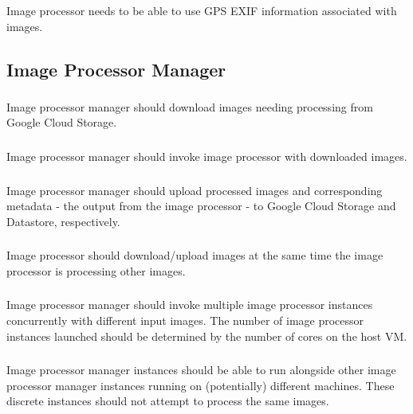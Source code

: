 \documentclass[10pt, onecolumn, draftclsnofoot, letterpaper, compsoc]{IEEEtran}
\begin{document}
Image processor needs to be able to use GPS EXIF information associated with
images.\\

\subsection{Image Processor Manager}

    \subsubsection{} 
    Image processor manager should download images needing processing 
    from Google Cloud Storage. \\

    \subsubsection{} 
    Image processor manager should invoke image processor with downloaded images. \\

    \subsubsection{} 
    Image processor manager should upload processed images and corresponding metadata 
    - the output from the image processor - to Google Cloud Storage and Datastore, respectively. \\

    \subsubsection{} 
    Image processor should download/upload images at the same time the image processor 
    is processing other images. \\

    \subsubsection{} 
    Image processor manager should invoke multiple image processor instances concurrently 
    with different input images. The number of image processor instances launched should be 
    determined by the number of cores on the host VM. \\

    \subsubsection{} 
    Image processor manager instances should be able to run alongside other image processor 
    manager instances running on (potentially) different machines. These discrete instances should 
    not attempt to process the same images. \\
\end{document}
